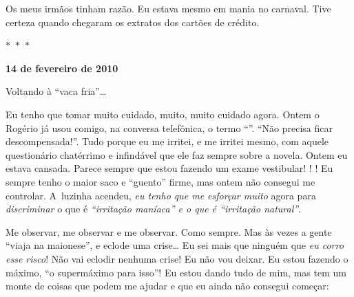 Os meus irmãos tinham razão. Eu estava mesmo em mania no carnaval. Tive
certeza quando chegaram os extratos dos cartões de crédito.

\begin{center}$\ast$~$\ast$~$\ast$\end{center}


\textbf{}

\begin{flushright}\textbf{14 de fevereiro de 2010}\end{flushright}


Voltando à ``vaca fria''…

Eu tenho que tomar muito cuidado, muito, muito cuidado agora. Ontem o
Rogério já usou comigo, na conversa telefônica, o termo
``''. ``Não precisa ficar descompensada!''. Tudo porque eu
me irritei, e me irritei mesmo, com aquele questionário chatérrimo e
infindável que ele faz sempre sobre a novela. Ontem eu estava cansada.
Parece sempre que estou fazendo um exame vestibular! ! !
Eu sempre tenho o maior saco e ``guento'' firme, mas ontem não consegui
me controlar. A~luzinha acendeu, \emph{eu tenho que me esforçar muito}
agora para \emph{discriminar} o que é \emph{``irritação maníaca'' e o
que é ``irritação natural''}.

Me observar, me observar e me observar. Como sempre. Mas às vezes a
gente ``viaja na maionese'', e eclode uma crise… Eu sei mais que
ninguém que \emph{eu corro esse risco}! Não vai eclodir nenhuma crise!
Eu não vou deixar. Eu estou fazendo o máximo, ``o supermáximo para
isso''! Eu estou dando tudo de mim, mas tem um monte de coisas que podem
me ajudar e que eu ainda não consegui começar:

